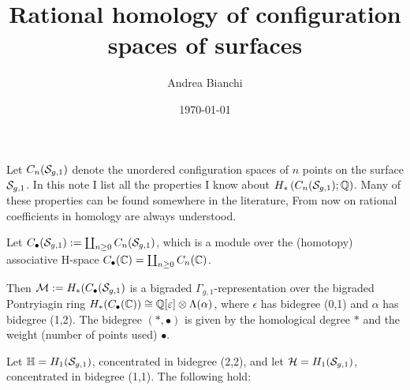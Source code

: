 \documentclass{amsart}
\theoremstyle{plain}
\theoremstyle{definition}
\begin{document}
\title{Rational homology of configuration spaces of surfaces}

\author{Andrea Bianchi}

\address{Mathematics Institute,
University of Bonn,
Endenicher Allee 60, Bonn,
Germany
}



\date{\today}

\maketitle
Let $C_n(\mathcal{S}_{g,1})$ denote the unordered configuration spaces of $n$ points
on the surface $\mathcal{S}_{g,1}$. In this note I list all the properties I know about $H_*\left(C_n(\mathcal{S}_{g,1});\mathbb{Q}\right)$.
Many of these properties can be found somewhere in the literature,
From now on rational coefficients in homology are always understood.

Let $C_{\bullet}(\mathcal{S}_{g,1}):=\coprod_{n\geq 0}C_n(\mathcal{S}_{g,1})$, which is a module over the 
(homotopy) associative H-space $C_{\bullet}(\mathbb{C})=\coprod_{n\geq 0}C_n(\mathbb{C})$.

Then $\mathcal{M}:=H_*(C_{\bullet}(\mathcal{S}_{g,1})$ is a bigraded $\Gamma_{g,1}$-representation over the bigraded Pontryiagin
ring $H_*(C_{\bullet}(\mathbb{C}))\cong\mathbb{Q}[\varepsilon]\otimes \Lambda (\alpha)$, where $\epsilon$ has
bidegree (0,1) and $\alpha$ has bidegree (1,2). The bidegree $(*,\bullet)$ is given by
the homological degree $*$ and the weight (number of points used) $\bullet$.

Let $\mathbb{H}=H_1(\mathcal{S}_{g,1})$, concentrated in bidegree (2,2), and let $\mathcal{H}=H_1(\mathcal{S}_{g,1})$, concentrated in bidegree (1,1).
The following hold:
\end{document}
